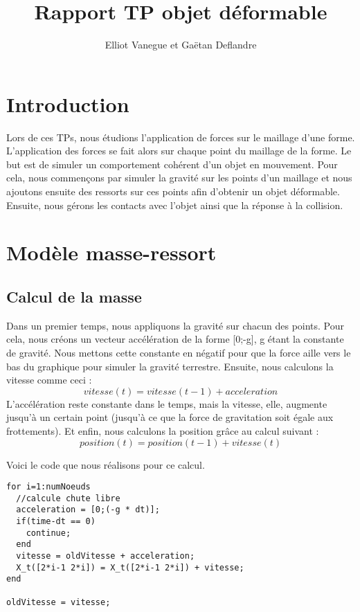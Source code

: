 \documentclass[a4paper,11pt]{article}
\title{Rapport TP objet déformable}
\author{Elliot Vanegue et Gaëtan Deflandre}
\begin{document}
\maketitle

\section{Introduction}
Lors de ces TPs, nous étudions l'application de forces sur le maillage d'une
forme. L'application des forces se fait alors sur chaque point du maillage de la forme.
Le but est de simuler un comportement cohérent d'un objet en mouvement. Pour cela, nous 
commençons par simuler la gravité sur les points d'un maillage et nous ajoutons
ensuite des ressorts sur ces points afin d'obtenir un objet déformable. Ensuite, nous 
gérons les contacts avec l'objet ainsi que la réponse à la collision.  

\section{Modèle masse-ressort}
\subsection{Calcul de la masse}
Dans un premier temps, nous appliquons la gravité sur chacun des points.
Pour cela, nous créons un vecteur accélération de la forme [0;-g], g étant la constante
de gravité. Nous mettons cette constante en négatif pour que la force aille vers le bas
du graphique pour simuler la gravité terrestre. Ensuite, nous calculons la vitesse comme ceci :
\begin{equation}
vitesse(t) = vitesse(t-1) + acceleration
\end{equation}
L'accélération reste constante dans le temps, mais la vitesse, elle, augmente jusqu'à un certain
point (jusqu'à ce que la force de gravitation soit égale aux frottements). Et enfin, nous calculons la position grâce au calcul suivant : 
\begin{equation}
position(t) = position(t-1) + vitesse(t)
\end{equation}

Voici le code que nous réalisons pour ce calcul.
\begin{lstlisting}[caption=Code du Calcul de la gravité]
for i=1:numNoeuds
  //calcule chute libre
  acceleration = [0;(-g * dt)];
  if(time-dt == 0)
    continue;
  end
  vitesse = oldVitesse + acceleration;
  X_t([2*i-1 2*i]) = X_t([2*i-1 2*i]) + vitesse;
end
    
oldVitesse = vitesse;
\end{lstlisting}
\end{document}
